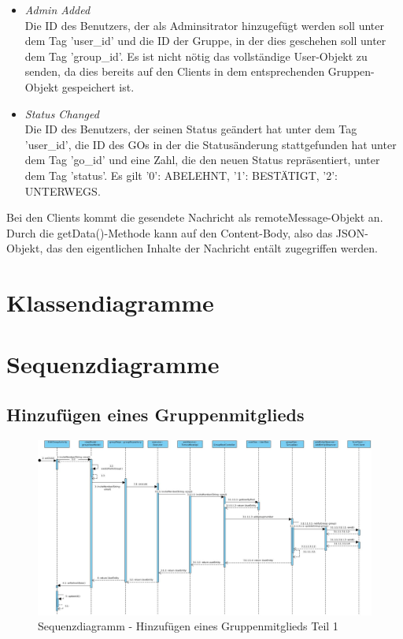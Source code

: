 \begin{itemize}
	\item \textit{Admin Added}\\
	Die ID des Benutzers, der als Adminsitrator hinzugefügt werden soll unter dem Tag 'user\_id' und die ID der Gruppe, in der dies geschehen soll unter dem Tag 'group\_id'. Es ist nicht nötig das vollständige User-Objekt zu senden, da dies bereits auf den Clients in dem entsprechenden Gruppen-Objekt gespeichert ist.
	\item \textit{Status Changed}\\
	Die ID des Benutzers, der seinen Status geändert hat unter dem Tag 'user\_id', die ID des GOs in der die Statusänderung stattgefunden hat unter dem Tag 'go\_id' und eine Zahl, die den neuen Status repräsentiert, unter dem Tag 'status'. Es gilt '0': ABELEHNT, '1': BESTÄTIGT, '2': UNTERWEGS.
\end{itemize}

Bei den Clients kommt die gesendete Nachricht als remoteMessage-Objekt an. Durch die getData()-Methode kann auf den Content-Body, also das JSON-Objekt, das den eigentlichen Inhalte der Nachricht entält zugegriffen werden.



\section{Klassendiagramme}

\section{Sequenzdiagramme}

\subsection{Hinzufügen eines Gruppenmitglieds}

\begin{figure}[H]
	\centering
	\includegraphics[width=1\textwidth]{../Sequenzdiagramme/addGroupMember.jpg}
	\caption{Sequenzdiagramm - Hinzufügen eines Gruppenmitglieds Teil 1}
\end{figure}

